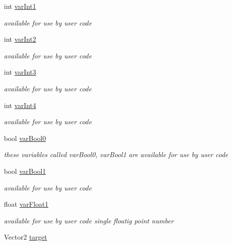 \begin{DoxyCompactItemize}
int \mbox{\hyperlink{class_r_c___framework_1_1_sprite3_a76f69d382ff8046c88681fe212a99176}{var\+Int1}}
\begin{DoxyCompactList}\small\item\em available for use by user code \end{DoxyCompactList}\item 
int \mbox{\hyperlink{class_r_c___framework_1_1_sprite3_a6dda4cde780442d3d2f226158fee5a11}{var\+Int2}}
\begin{DoxyCompactList}\small\item\em available for use by user code \end{DoxyCompactList}\item 
int \mbox{\hyperlink{class_r_c___framework_1_1_sprite3_ae6cca5521f73ec073caa66b816ab8408}{var\+Int3}}
\begin{DoxyCompactList}\small\item\em available for use by user code \end{DoxyCompactList}\item 
int \mbox{\hyperlink{class_r_c___framework_1_1_sprite3_a461eb5bc92dd3eff6daff40147f060eb}{var\+Int4}}
\begin{DoxyCompactList}\small\item\em available for use by user code \end{DoxyCompactList}\item 
bool \mbox{\hyperlink{class_r_c___framework_1_1_sprite3_a77c5b7c794daacbd31c49f83e40978f9}{var\+Bool0}}
\begin{DoxyCompactList}\small\item\em these variables called var\+Bool0, var\+Bool1 are available for use by user code \end{DoxyCompactList}\item 
bool \mbox{\hyperlink{class_r_c___framework_1_1_sprite3_a5f9e5ed1f2c6b498eb2ca9e461c8bebc}{var\+Bool1}}
\begin{DoxyCompactList}\small\item\em available for use by user code \end{DoxyCompactList}\item 
float \mbox{\hyperlink{class_r_c___framework_1_1_sprite3_aa90e0f3319e1d183780eaa4570d6bf2b}{var\+Float1}}
\begin{DoxyCompactList}\small\item\em available for use by user code single floatig point number \end{DoxyCompactList}\item 
Vector2 \mbox{\hyperlink{class_r_c___framework_1_1_sprite3_a7a99bed1590ff1e7e1f7c52a4a53c37e}{target}}

\end{DoxyCompactItemize}

